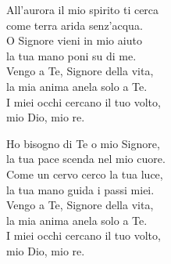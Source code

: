 
\strofa All'aurora il mio spirito ti cerca\\
come terra arida senz'acqua.\\
O Signore vieni in mio aiuto\\
la tua mano poni su di me.\\
Vengo a Te, Signore della vita,\\
la mia anima anela solo a Te.\\
I miei occhi cercano il tuo volto,\\
mio Dio, mio re.

\spazio


\spazio

\strofa Ho bisogno di Te o mio Signore,\\
la tua pace scenda nel mio cuore.\\
Come un cervo cerco la tua luce,\\
la tua mano guida i passi miei.\\
Vengo a Te, Signore della vita,\\
la mia anima anela solo a Te.\\
I miei occhi cercano il tuo volto,\\
mio Dio, mio re.

\spazio

 
